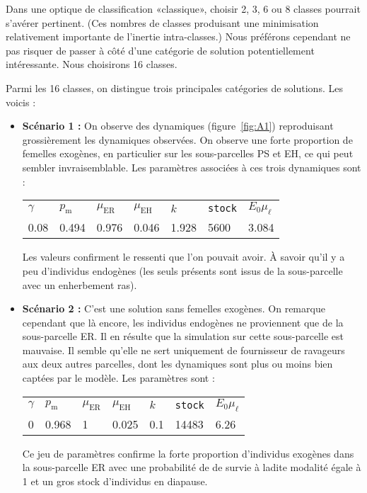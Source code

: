 Dans une optique de classification «classique», choisir 2, 3, 6 ou 8 classes pourrait s'avérer pertinent.
(Ces nombres de classes produisant une minimisation relativement importante de l'inertie intra-classes.)
Nous préférons cependant ne pas risquer de passer à côté d'une catégorie de solution potentiellement intéressante.
Nous choisirons 16 classes.

Parmi les 16 classes, on distingue trois principales catégories de solutions.
Les voicis :
\begin{itemize}
 \item \textbf{Scénario 1 :} On observe des dynamiques (figure~\ref{fig:A1}) reproduisant grossièrement les dynamiques observées. 
 On observe une forte proportion de femelles exogènes, en particulier sur les sous-parcelles PS et EH, ce qui peut sembler invraisemblable.
 Les paramètres associées à ces trois dynamiques sont :
 \begin{center}
\begin{tabular}{lllllll}
$\gamma$ & $p_{\text{m}}$ & $\mu_{\text{ER}}$ & $\mu_{\text{EH}}$ & $k$ & \texttt{stock} & $E_0\mu_{\ell}$\\
0.08 & 0.494 & 0.976 & 0.046 & 1.928 & 5600 & 3.084
 \end{tabular}
 \end{center}
Les valeurs confirment le ressenti que l'on pouvait avoir. 
À savoir qu'il y a peu d'individus endogènes (les seuls présents sont issus de la sous-parcelle avec un enherbement ras).
\item \textbf{Scénario 2 :} C'est une solution sans femelles exogènes.
On remarque cependant que là encore, les individus endogènes ne proviennent que de la sous-parcelle ER.
Il en résulte que la simulation sur cette sous-parcelle est mauvaise. 
Il semble qu'elle ne sert uniquement de fournisseur de ravageurs aux deux autres parcelles, dont les dynamiques sont plus ou moins bien captées par le modèle.
Les paramètres sont :
 \begin{center}
\begin{tabular}{lllllll}
$\gamma$ & $p_{\text{m}}$ & $\mu_{\text{ER}}$ & $\mu_{\text{EH}}$ & $k$ & \texttt{stock} & $E_0\mu_{\ell}$\\
0 & 0.968 & 1 & 0.025 & 0.1 & 14483 & 6.26
 \end{tabular}
 \end{center}
Ce jeu de paramètres confirme la forte proportion d'individus exogènes dans la sous-parcelle ER avec une probabilité de de survie à ladite modalité égale à 1 et un gros stock d'individus en diapause.

\end{itemize}
